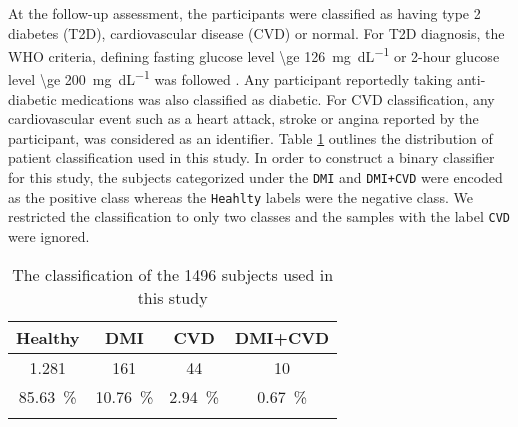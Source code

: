 \documentclass[journal,comsoc]{IEEEtran}
\renewcommand{\^}{\hat}  %
\begin{document}
At the follow-up assessment, the participants were classified as having type 2 diabetes (T2D), cardiovascular disease (CVD) or normal. For T2D diagnosis, the WHO criteria, defining fasting glucose level \SI[round-mode = off,group-separator = {,}]{\ge 126}{\milli\gram\per\deci\liter} or 2-hour glucose level \SI[round-mode = off,group-separator = {,}]{\ge 200}{\milli\gram\per\deci\liter} was followed \cite{wei_effects_1998}. Any participant reportedly taking anti-diabetic medications was also classified as diabetic. For CVD classification, any cardiovascular event such as a heart attack, stroke or angina reported by the participant, was considered as an identifier. Table \ref{tab:patients} outlines the distribution of patient classification used in this study. In order to construct a binary classifier for this study, the subjects categorized under the \texttt{DMI} and \texttt{DMI+CVD} were encoded as the positive class whereas the \texttt{Heahlty}  labels were the negative class. We restricted the classification to only two classes and the samples with the label \texttt{CVD} were ignored.
%
\begin{table}[!h]
  \caption{The classification of the \num[group-minimum-digits=4, group-separator = {,}]{1496} subjects used in this study}
  \centering
  \begin{tabular}{c c c c}
    \toprule
    Healthy &  DMI & CVD & DMI+CVD\\
    \midrule \midrule
    \num[group-minimum-digits=4, group-separator = {,}]{1,281} & \num{161} & \num{44} & \num{10}\\
    \SI{85.63}{\percent} & \SI{10.76}{\percent} & \SI[round-precision=3]{2.94}{\percent} & \SI[round-precision=2]{0.67}{\percent} \\
    \bottomrule \\
  \end{tabular}
  \label{tab:patients}
\end{table}
%
%
\end{document}
